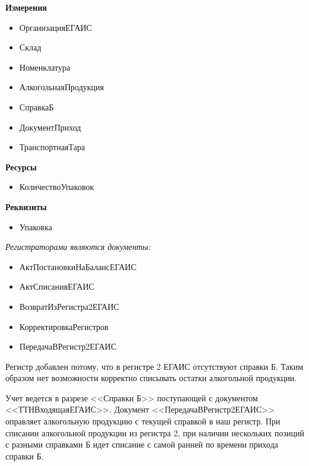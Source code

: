 \vspace{\baselineskip}
\begin{minipage}{0.5\textwidth}
        \noindent\textbf{Измерения}
        \begin{itemize}
            \item ОрганизацияЕГАИС
            \item Склад
            \item Номенклатура
            \item АлкогольнаяПродукция
            \item СправкаБ
            \item ДокументПриход
            \item ТранспортнаяТара
        \end{itemize}
        \textbf{Ресурсы}
        \begin{itemize}
            \item КоличествоУпаковок
        \end{itemize}
        \textbf{Реквизиты}
        \begin{itemize}
            \item Упаковка
        \end{itemize}
        \vspace{\baselineskip}
\end{minipage}
\hfill
\begin{minipage}{0.5\textwidth}
      \noindent\textit{Регистраторами являются документы:}

       \begin{itemize}
           \item АктПостановкиНаБалансЕГАИС
           \item АктСписанияЕГАИС
           \item ВозвратИзРегистра2ЕГАИС
           \item КорректировкаРегистров
           \item ПередачаВРегистр2ЕГАИС
       \end{itemize}
\end{minipage}

Регистр добавлен потому, что в регистре 2 ЕГАИС отсутствуют справки Б. Таким образом нет возможности корректно списывать остатки алкогольной продукции.

Учет ведется в разрезе <<Справки Б>> поступающей с документом <<ТТНВходящаяЕГАИС>>. Документ  <<ПередачаВРегистр2ЕГАИС>> оправляет алкогольную продукцию с текущей справкой в наш регистр. При списании алкогольной продукции из регистра 2,  при наличии нескольких позиций с разными справками Б идет списание с самой ранней по времени прихода справки Б.


